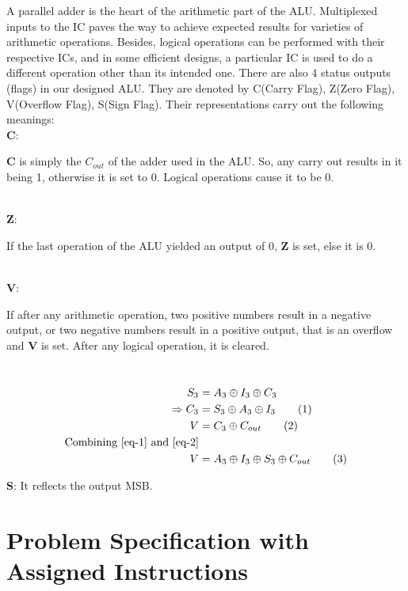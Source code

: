 \documentclass{article}
\begin{document}
 A parallel adder is the heart of the arithmetic part of the ALU. Multiplexed inputs to the
 IC paves the way to achieve expected results for varieties of arithmetic operations. Besides,
 logical operations can be performed with their respective ICs, and in some efficient designs,
 a particular IC is used to do a different operation other than its intended one.
 There are also 4 status outputs (flags) in our designed ALU. They are denoted by C(Carry
 Flag), Z(Zero Flag), V(Overflow Flag), S(Sign Flag). Their representations carry out the
 following meanings:\\



\noindent
\textbf{C}: \hspace*{0.5cm} \parbox[t]{5in}{\textbf{C} is simply the $C_{out}$ of the adder used in the ALU. So, any carry out results in it being 1, otherwise it is set to 0. Logical operations cause it to be 0.}\\[0.5cm]

\noindent
\textbf{Z}: \hspace*{0.5cm} \parbox[t]{5in}{If the last operation of the ALU yielded an output of 0, \textbf{Z} is set, else it is 0.}\\[0.5cm]

\noindent
\textbf{V}: \hspace*{0.5cm} \parbox[t]{5in}{If after any arithmetic operation, two positive numbers result in a negative output, or two negative numbers result in a positive output, that is an overflow and \textbf{V} is set. After any logical operation, it is cleared.}\\

\begin{align}
S_3 &= A_3 \oplus I_3 \oplus C_3 \notag \\
\Rightarrow C_3 &= S_3 \oplus A_3 \oplus I_3 \tag{1} \label{eq-1}\\
V &= C_3 \oplus C_{out} \tag{2}  \label{eq-2}\\
\text{Combining \ref{eq-1} and \ref{eq-2}}  \notag\\
V &= A_3 \oplus I_3 \oplus S_3 \oplus C_{out} \tag{3}
\end{align}


\noindent
 \textbf{S}: It reflects the output MSB.\\



\pagebreak

\Large
\section{Problem Specification with Assigned Instructions}
\end{document}
